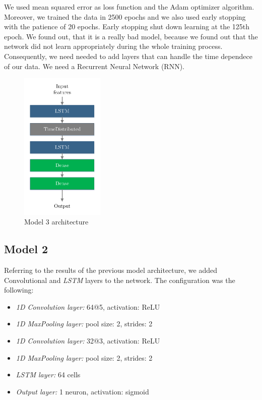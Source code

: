 \documentclass[conference]{IEEEtran}
\begin{document}
\vspace{3px}

We used mean squared error as loss function and the Adam optimizer algorithm. Moreover, we trained the data in 2500 epochs and we also used early stopping with the patience of 20 epochs. Early stopping shut down learning at the 125th epoch. We found out, that it is a really bad model, because we found out that the network did not learn appropriately during the whole training process. Consequently, we need needed to add layers that can handle the time dependece of our data. We need a Recurrent Neural Network (RNN).

\begin{figure}[!ht]
  \centering
  \includegraphics[width=40mm, keepaspectratio]{figures/nn-model-3.pdf}
  \caption{Model 3 architecture}
  \label{fig:nn-model-3}
\end{figure}

\subsection{Model 2}

Referring to the results of the previous model architecture, we added Convolutional and \emph{LSTM} layers to the network. The configuration was the following:

\vspace{3px}

\begin{itemize}
  \item \textit{1D Convolution layer:} 64@5, activation: ReLU
  \item \textit{1D MaxPooling layer:} pool size: 2, strides: 2
  \item \textit{1D Convolution layer:} 32@3, activation: ReLU
  \item \textit{1D MaxPooling layer:} pool size: 2, strides: 2
  \item \textit{LSTM layer:} 64 cells
  \item \textit{Output layer:} 1 neuron, activation: sigmoid
\end{itemize}
\end{document}
